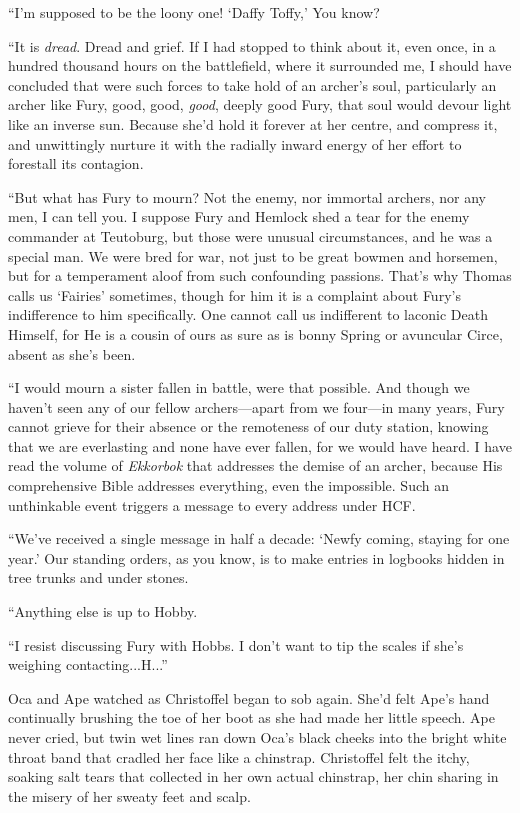 \documentclass[11pt,a5paper]{article}
\begin{document}
``I'm supposed to be the loony one! `Daffy Toffy,' You know?

``It is \emph{dread}. Dread and grief. If I had stopped to think about it, even once, in a hundred thousand hours on the battlefield, where it surrounded me, I should have concluded that were such forces to take hold of an archer's soul, particularly an archer like Fury, good, good, \emph{good}, deeply good Fury, that soul would devour light like an inverse sun. Because she'd hold it forever at her centre, and compress it, and unwittingly nurture it with the radially inward energy of her effort to forestall its contagion.

``But what has Fury to mourn? Not the enemy, nor immortal archers, nor any men, I can tell you. I suppose Fury and Hemlock shed a tear for the enemy commander at Teutoburg, but those were unusual circumstances, and he was a special man. We were bred for war, not just to be great bowmen and horsemen, but for a temperament aloof from such confounding passions. That's why Thomas calls us `Fairies' sometimes, though for him it is a complaint about Fury's indifference to him specifically. One cannot call us indifferent to laconic Death Himself, for He is a cousin of ours as sure as is bonny Spring or avuncular Circe, absent as she's been.

``I would mourn a sister fallen in battle, were that possible. And though we haven't seen any of our fellow archers---apart from we four---in many years, Fury cannot grieve for their absence or the remoteness of our duty station, knowing that we are everlasting and none have ever fallen, for we would have heard. I have read the volume of \emph{Ekkorbok} that addresses the demise of an archer, because His comprehensive Bible addresses everything, even the impossible. Such an unthinkable event triggers a message to every address under HCF.

``We've received a single message in half a decade: `Newfy coming, staying for one year.' Our standing orders, as you know, is to make entries in logbooks hidden in tree trunks and under stones.

``Anything else is up to Hobby.

``I resist discussing Fury with Hobbs. I don't want to tip the scales if she's weighing contacting...H...''

Oca and Ape watched as Christoffel began to sob again. She'd felt Ape's hand continually brushing the toe of her boot as she had made her little speech. Ape never cried, but twin wet lines ran down Oca's black cheeks into the bright white throat band that cradled her face like a chinstrap. Christoffel felt the itchy, soaking salt tears that collected in her own actual chinstrap, her chin sharing in the misery of her sweaty feet and scalp.
\end{document}
